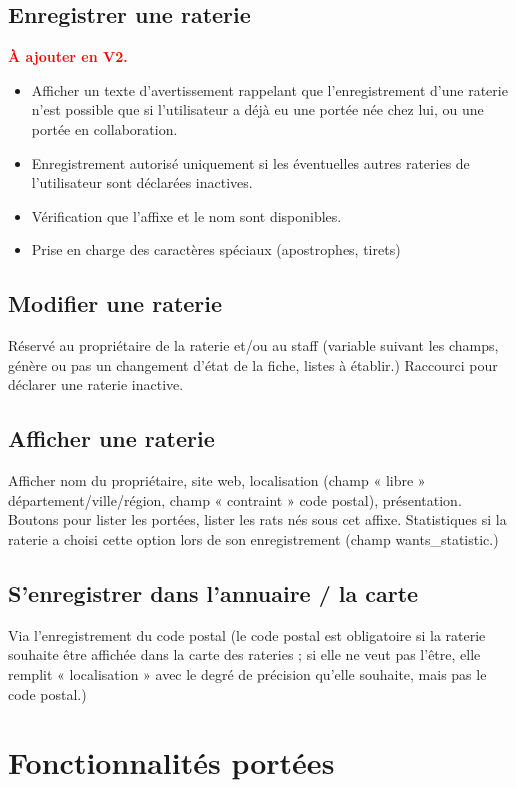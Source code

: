\documentclass[a4paper,10pt]{article}
\newcommand\desire[1]{\noindent\textbf{\textcolor{red}{#1}}}
\begin{document}
\subsection{Enregistrer une raterie}

\desire{\`A ajouter en V2.} 
\begin{itemize}
\item Afficher un texte d'avertissement rappelant que l'enregistrement d'une raterie n'est possible que si l'utilisateur a déjà eu une portée née chez lui, ou une portée en collaboration.
\item Enregistrement autorisé uniquement si les éventuelles autres rateries de l'utilisateur sont déclarées inactives.
\item Vérification que l'affixe et le nom sont disponibles. 
\item Prise en charge des caractères spéciaux (apostrophes, tirets)
\end{itemize}

\subsection{Modifier une raterie}
Réservé au propriétaire de la raterie et/ou au staff (variable suivant les champs, génère ou pas un changement d'état de la fiche, listes à établir.) Raccourci pour déclarer une raterie inactive.

\subsection{Afficher une raterie}
Afficher nom du propriétaire, site web, localisation (champ « libre » département/ville/région, champ « contraint » code postal), présentation. Boutons pour lister les portées, lister les rats nés sous cet affixe. Statistiques si la raterie a choisi cette option lors de son enregistrement (champ wants\_statistic.)
\subsection{S'enregistrer dans l'annuaire / la carte}
Via l'enregistrement du code postal (le code postal est obligatoire si la raterie souhaite être affichée dans la carte des rateries ; si elle ne veut pas l'être, elle remplit « localisation » avec le degré de précision qu'elle souhaite, mais pas le code postal.)   

\section{Fonctionnalités portées}
\end{document}
